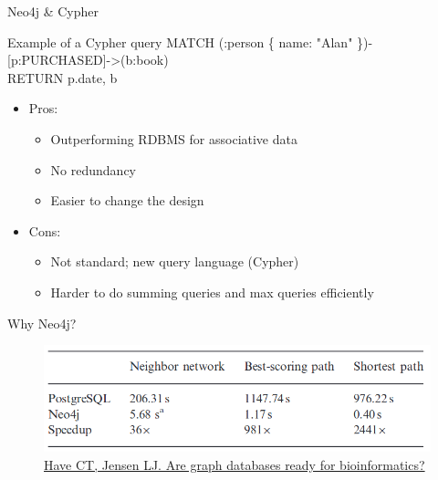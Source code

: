 \documentclass{beamer}
\begin{document}
\begin{frame}{Neo4j \& Cypher}
\begin{block}{Example of a Cypher query}
MATCH (:person \{ name: "Alan" \})-[p:PURCHASED]-\textgreater(b:book) \\
RETURN p.date, b
\end{block}
\begin{itemize}
    \item Pros:
    \begin{itemize}
        \item Outperforming RDBMS for associative data
        \item No redundancy
        \item Easier to change the design
    \end{itemize}
    \vfill
    \item Cons:
    \begin{itemize}
        \item Not standard; new query language (Cypher)
        \item Harder to do summing queries and max queries efficiently
    \end{itemize}
\end{itemize}
\end{frame}

\begin{frame}{Why Neo4j?}
    \begin{figure}
        \centering
        \includegraphics[width=0.7\linewidth]{graph-dbs-benchmark.png}
        \caption{\href{https://www.ncbi.nlm.nih.gov/pmc/articles/PMC3842757/}{Have CT, Jensen LJ. Are graph databases ready for bioinformatics?}}
    \end{figure}
\end{frame}
\end{document}
